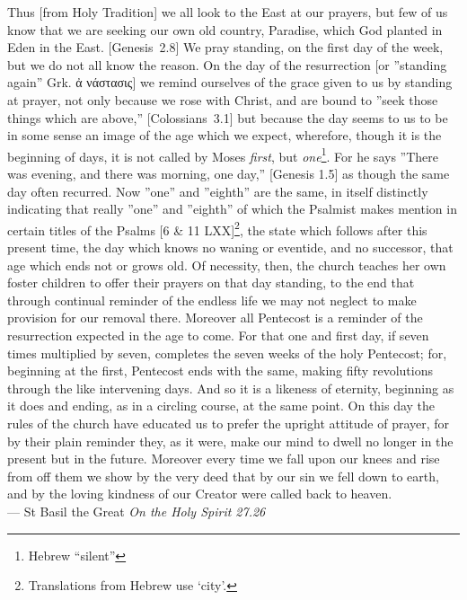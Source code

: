 \documentclass[
]{article}
\newcommand{\RL}[1]{\beginR #1\endR}
\begin{document}
Thus {[}from Holy Tradition{]} we all look to the East at our prayers,
but few of us know that we are seeking our own old country, Paradise,
which God planted in Eden in the East. {[}Genesis~2.8{]} We pray
standing, on the first day of the week, but we do not all know the
reason. On the day of the resurrection {[}or \RL{''}standing again''
Grk. ἀ νάστασις{]} we remind ourselves of the grace given to us by
standing at prayer, not only because we rose with Christ, and are bound
to \RL{''}seek those things which are above,'' {[}Colossians~3.1{]} but
because the day seems to us to be in some sense an image of the age
which we expect, wherefore, though it is the beginning of days, it is
not called by Moses \emph{first}, but \emph{one}\footnote{Hebrew
  ``silent''}. For he says \RL{''}There was evening, and there was
morning, one day,'' {[}Genesis 1.5{]} as though the same day often
recurred. Now \RL{''}one'' and \RL{''}eighth'' are the same, in itself
distinctly indicating that really \RL{''}one'' and \RL{''}eighth'' of
which the Psalmist makes mention in certain titles of the Psalms {[}6 \&
11 LXX{]}\footnote{Translations from Hebrew use `city'.}, the state
which follows after this present time, the day which knows no waning or
eventide, and no successor, that age which ends not or grows old. Of
necessity, then, the church teaches her own foster children to offer
their prayers on that day standing, to the end that through continual
reminder of the endless life we may not neglect to make provision for
our removal there. Moreover all Pentecost is a reminder of the
resurrection expected in the age to come. For that one and first day, if
seven times multiplied by seven, completes the seven weeks of the holy
Pentecost; for, beginning at the first, Pentecost ends with the same,
making fifty revolutions through the like intervening days. And so it is
a likeness of eternity, beginning as it does and ending, as in a
circling course, at the same point. On this day the rules of the church
have educated us to prefer the upright attitude of prayer, for by their
plain reminder they, as it were, make our mind to dwell no longer in the
present but in the future. Moreover every time we fall upon our knees
and rise from off them we show by the very deed that by our sin we fell
down to earth, and by the loving kindness of our Creator were called
back to heaven.\\
--- St Basil the Great \emph{On the Holy Spirit 27.26}
\end{document}
